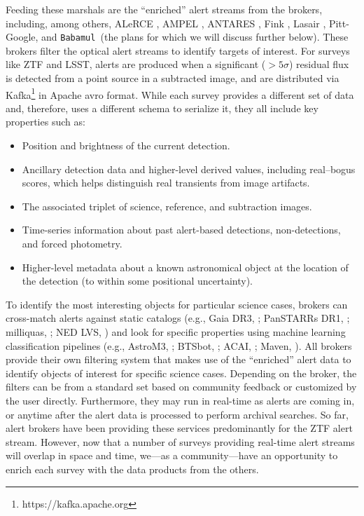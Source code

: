\documentclass[twocolumn]{aastex631}
\newcommand{\babamul}{\texttt{Babamul }}
\begin{document}
Feeding these marshals are the ``enriched'' alert streams from the brokers, including, among others, ALeRCE \citep{FoCa2021}, AMPEL \citep{Nordin:2019kxt}, ANTARES \citep{MaSt2021}, Fink \citep{MoPe2020}, Lasair \citep{SmWi2019}, Pitt-Google, and \babamul (the plans for which we will discuss further below). These brokers filter the optical alert streams to identify targets of interest. For surveys like ZTF and LSST, alerts are produced when a significant ($> 5 \sigma$) residual flux is detected from a point source in a subtracted image, and are distributed via Kafka\footnote{https://kafka.apache.org} in Apache avro format. While each survey provides a different set of data and, therefore, uses a different schema to serialize it, they all include key properties such as:
\begin{itemize}
    \item Position and brightness of the current detection.
    \item Ancillary detection data and higher-level derived values, including real--bogus scores, which helps distinguish real transients from image artifacts.
    \item The associated triplet of science, reference, and subtraction images.
    \item Time-series information about past alert-based detections, non-detections, and forced photometry.
    \item Higher-level metadata about a known astronomical object at the location of the detection (to within some positional uncertainty).
\end{itemize}

To identify the most interesting objects for particular science cases, brokers can cross-match alerts against static catalogs (e.g., Gaia DR3, \cite{Gaia2023}; PanSTARRs DR1, \cite{ChMa2016}; milliquas, \cite{Flesch_2023}; NED LVS, \cite{Cook_2023}) and look for specific properties using machine learning classification pipelines (e.g., AstroM3, \cite{rizhko2024astrom}; BTSbot, \cite{Rehemtulla+2024}; ACAI, \cite{duev2021phenomenologicalclassificationzwickytransient}; Maven, \cite{zhang2024mavenmultimodalfoundationmodel}). All brokers provide their own filtering system that makes use of the ``enriched'' alert data to identify objects of interest for specific science cases. Depending on the broker, the filters can be from a standard set based on community feedback or customized by the user directly. Furthermore, they may run in real-time as alerts are coming in, or anytime after the alert data is processed to perform archival searches. So far, alert brokers have been providing these services predominantly for the ZTF alert stream. However, now that a number of surveys providing real-time alert streams will overlap in space and time, we---as a community---have an opportunity to enrich each survey with the data products from the others.
\end{document}
